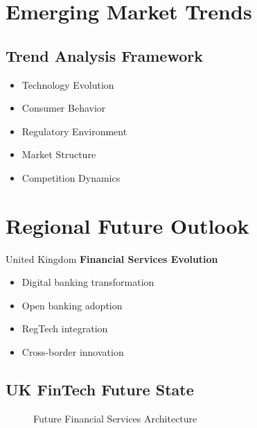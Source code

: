 \section{Emerging Market Trends}

\subsection{Trend Analysis Framework}
\begin{tcolorbox}[colback=white,colframe=primarydark,title=\textbf{Trend Categories}]
\begin{itemize}
    \item Technology Evolution
    \item Consumer Behavior
    \item Regulatory Environment
    \item Market Structure
    \item Competition Dynamics
\end{itemize}
\end{tcolorbox}

\FloatBarrier
\section{Regional Future Outlook}

\begin{regionalbox}{United Kingdom}
\textbf{Financial Services Evolution}
\begin{itemize}
    \item Digital banking transformation
    \item Open banking adoption
    \item RegTech integration
    \item Cross-border innovation
\end{itemize}
\end{regionalbox}

\subsection{UK FinTech Future State}
\begin{figure}[htbp]
    \centering
    \caption{Future Financial Services Architecture}
    \label{fig:future-fintech}
\end{figure}

